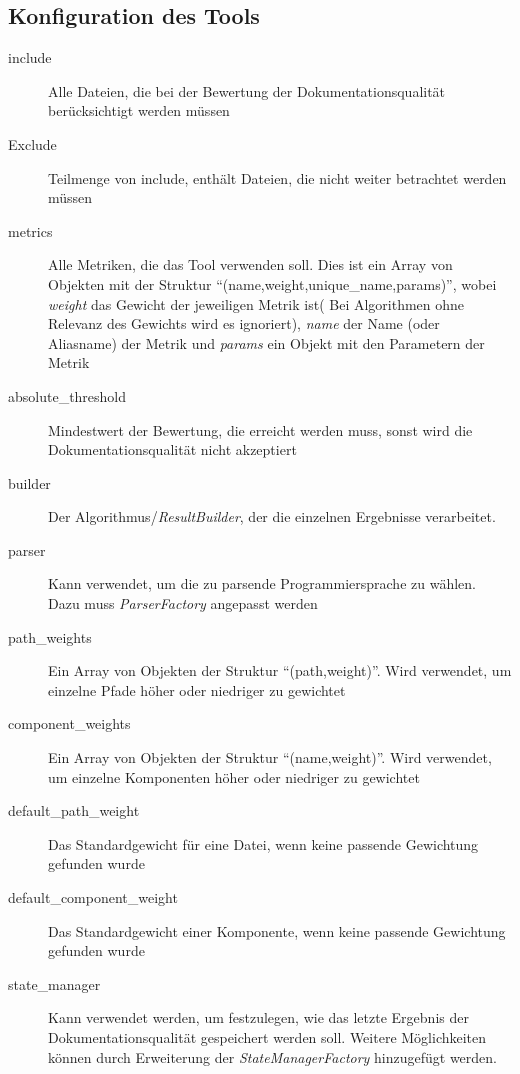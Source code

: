 \begin{appendices}
\chapter{Konfiguration des Tools}
\begin{description}
        \item[include]  Alle Dateien, die bei der Bewertung der Dokumentationsqualität berücksichtigt werden müssen
        \item[Exclude]  Teilmenge von include, enthält Dateien, die nicht weiter betrachtet werden müssen
        \item[metrics]  Alle Metriken, die das Tool verwenden soll. Dies ist ein Array von Objekten mit der Struktur \enquote{(name,weight,unique\_name,params)}, wobei \textit{weight} das Gewicht der jeweiligen Metrik ist( Bei Algorithmen ohne Relevanz des Gewichts wird es ignoriert), \textit{name} der Name (oder Aliasname) der Metrik und \textit{params} ein Objekt mit den Parametern der Metrik
        \item[absolute\_threshold] Mindestwert der Bewertung, die erreicht werden muss, sonst wird die Dokumentationsqualität nicht akzeptiert
       
          \item[builder] Der Algorithmus/\textit{ResultBuilder}, der die einzelnen Ergebnisse verarbeitet.
        
        \item[parser]  Kann verwendet, um die zu parsende Programmiersprache zu wählen. Dazu muss \textit{ParserFactory} angepasst werden
        
        \item[path\_weights] Ein Array von Objekten der Struktur \enquote{(path,weight)}. Wird verwendet, um einzelne Pfade höher oder niedriger zu gewichtet
        
         \item[component\_weights] Ein Array von Objekten der Struktur \enquote{(name,weight)}. Wird verwendet, um einzelne Komponenten höher oder niedriger zu gewichtet
         
         \item[default\_path\_weight] Das Standardgewicht für eine Datei, wenn keine passende Gewichtung gefunden wurde
         
         \item[default\_component\_weight] Das Standardgewicht einer Komponente, wenn keine passende Gewichtung gefunden wurde
         
         \item[state\_manager] Kann verwendet werden, um festzulegen, wie das letzte Ergebnis der Dokumentationsqualität gespeichert werden soll. Weitere Möglichkeiten können durch Erweiterung der \textit{StateManagerFactory} hinzugefügt werden.
         

\end{description}
\end{appendices}
